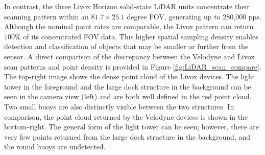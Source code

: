 \documentclass{erauthesis}
\begin{document}

In contrast, the three Livox Horizon solid-state \ac{LiDAR} units concentrate their scanning pattern within an $81.7 \times 25.1$ degree \ac{FOV}, generating up to 280,000 \ac{pps}. 
Although the nominal point rates are comparable, the Livox pattern can return $100 \%$ of its concentrated \ac{FOV} data. 
This higher spatial sampling density enables detection and classification of objects that may be smaller or further from the sensor.
A direct comparison of the discrepancy between the Velodyne and Livox scan patterns and point density is provided in Figure \ref{fig:LiDAR_scan_compare}.
The top-right image shows the dense point cloud of the Livox devices.
The light tower in the foreground and the large dock structure in the background can be seen in the camera view (left) and are both well defined in the red point cloud.
Two small buoys are also distinctly visible between the two structures.
In comparison, the point cloud returned by the Velodyne devices is shown in the bottom-right. 
The general form of the light tower can be seen; however, there are very few points returned from the large dock structure in the background, and the round buoys are undetected.
\end{document}
